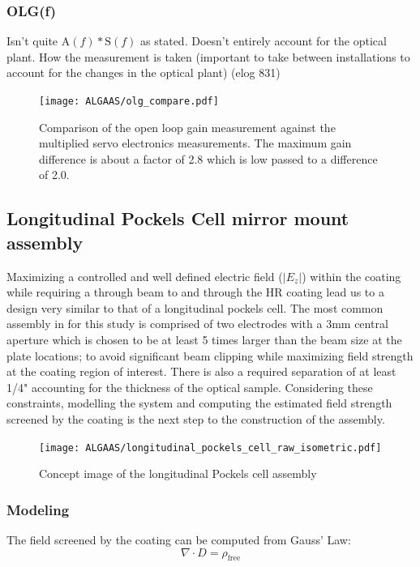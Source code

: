 \subsubsection{OLG(f)}
Isn't quite $\mathrm{A}(f)*\mathrm{S}(f)$ as stated. Doesn't entirely account for the optical plant.
How the measurement is taken (important to take between installations to account for the changes in the optical plant) (elog 831)

\begin{figure}[H]
\begin{center}
\texttt{[image: ALGAAS/olg\_compare.pdf]}
\end{center}
\caption{Comparison of the open loop gain measurement against the multiplied servo electronics measurements. The maximum gain difference is about a factor of 2.8 which is low passed to a difference of 2.0.}
\label{fig:OLGcompare}
\end{figure}

\subsection{Longitudinal Pockels Cell mirror mount assembly}
Maximizing a controlled and well defined electric field ($|E_z|$) within the coating while requiring a through beam to and through the HR coating lead us to a design very similar to that of a longitudinal pockels cell. The most common assembly in for this study is comprised of two electrodes with a 3mm central aperture which is chosen to be at least 5 times larger than the beam size at the plate locations; to avoid significant beam clipping while maximizing field strength at the coating region of interest. There is also a required separation of at least 1/4" accounting for the thickness of the optical sample. Considering these constraints, modelling the system and computing the estimated field strength screened by the coating is the next step to the construction of the assembly.

\begin{figure}[H]
\begin{center}
\texttt{[image: ALGAAS/longitudinal\_pockels\_cell\_raw\_isometric.pdf]}
\end{center}
\caption{Concept image of the longitudinal Pockels cell assembly}
\label{fig:pckcellconcept}
\end{figure}

\subsubsection{Modeling}
The field screened by the coating can be computed from Gauss' Law:
\begin{equation}
\nabla \cdot D = \rho_\mathrm{free}
\end{equation}


